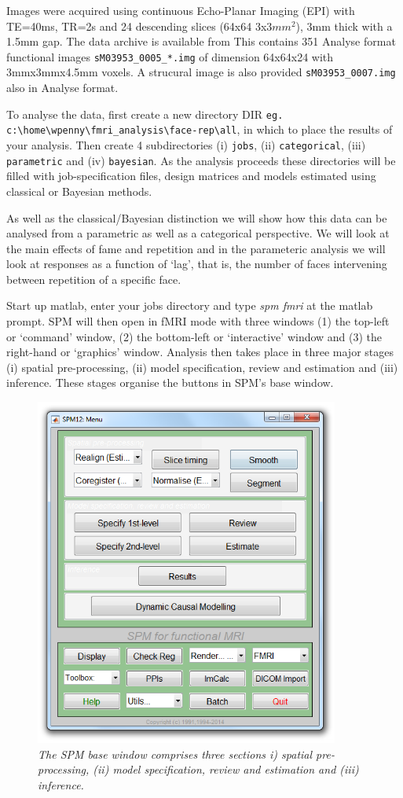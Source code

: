 \documentclass[a4paper,titlepage]{book}
\begin{document}
Images were acquired using continuous Echo-Planar 
Imaging (EPI) with TE=40ms, TR=2s and 24 descending slices (64x64 3x3$mm^2$), 3mm thick with a 1.5mm gap.
The data archive is available from 
This contains 351 Analyse format functional images
\verb!sM03953_0005_*.img! of dimension 
64x64x24 with 3mmx3mmx4.5mm voxels. A strucural 
image is also provided \verb!sM03953_0007.img! also in Analyse format.

To analyse the data, first create a new directory DIR 
\newline \verb!eg. c:\home\wpenny\fmri_analysis\face-rep\all!, in which to place the results
of your analysis. Then create 4 subdirectories (i) \verb!jobs!, 
(ii)  \verb!categorical!, (iii)  \verb!parametric! and (iv) \verb!bayesian!. As the analysis 
proceeds these directories will be filled with job-specification files, design matrices 
and models estimated using classical or Bayesian 
methods. 

As well as the classical/Bayesian 
distinction we will show how this 
data can be analysed from a parametric as well as a categorical perspective. We will look at the 
main effects of fame and repetition and in the 
parameteric analysis we will look at 
responses as a function of `lag', that is, the number of faces intervening between repetition of a specific face.

Start up matlab, enter your jobs directory and type {\em spm fmri} at the matlab prompt. SPM will then open in fMRI mode with three windows (1) the top-left or `command' window, (2) the 
bottom-left or `interactive' window
and (3) the right-hand or `graphics' window. 
Analysis 
then takes place in three major stages (i) 
spatial pre-processing, (ii) model specification, review 
and estimation and (iii) inference. These stages organise the buttons 
in SPM's base window.
\begin{figure}
\begin{center}
\includegraphics[width=100mm]{command}
\caption{\em The SPM base window comprises 
three sections i) 
spatial pre-processing, (ii) model specification, review 
and estimation and (iii) inference. \label{command}}
\end{center}
\end{figure}
\end{document}
